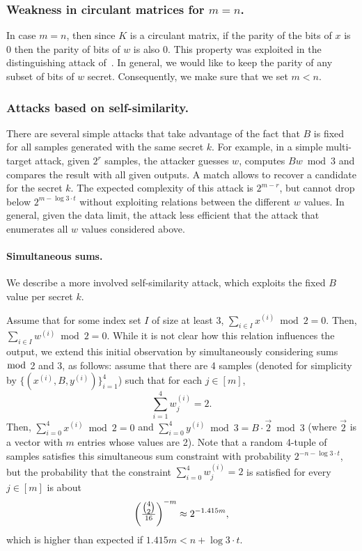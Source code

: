 \documentclass[orivec,envcountsect]{llncs}
\begin{document}
\subsubsection{Weakness in circulant matrices for $m=n$.}
In case $m =n$, then since $K$ is a circulant matrix, if the parity of the bits of $x$ is 0 then the parity of bits of $w$ is also 0.
This property was exploited in the distinguishing attack of~\cite{CheonCKK20}. In general, we would like to keep the parity of any subset of bits of $w$ secret. Consequently, we make sure that we set $m < n$.


\subsubsection{Attacks based on self-similarity.}

There are several simple attacks that take advantage of the fact that $B$ is fixed for all samples generated with the same secret $k$.
For example, in a simple multi-target attack, given $2^r$ samples, the attacker guesses $w$, computes $B w \bmod 3$ and compares the result
with all given outputs. A match allows to recover a candidate for the secret $k$.
The expected complexity of this attack is $2^{m-r}$, but cannot drop below $2^{m - \log 3 \cdot t}$ without exploiting relations between the different $w$ values. In general, given the data limit, the attack less efficient that the attack that enumerates all $w$ values considered above.

\paragraph{Simultaneous sums.}

We describe a more involved self-similarity attack, which exploits the fixed $B$ value per secret $k$.

Assume that for some index set $I$ of size at least 3, $\sum_{i \in I} x^{(i)} \bmod 2 = 0$. Then, $\sum_{i \in I} w^{(i)} \bmod 2 = 0$. While it is not clear how this relation influences the output,
we extend this initial observation by simultaneously considering sums $\bmod$ 2 and 3, as follows: 
assume that there are 4 samples (denoted for simplicity
by $ \{(x^{(i)},B,y^{(i)})\}_{i=1}^{4}$) such that for each $j \in [m]$, 
$$\sum_{i = 1}^{4} w^{(i)}_j = 2.$$
Then, $\sum_{i = 0}^{4} x^{(i)} \bmod 2 = 0$ and $\sum_{i = 0}^{4} y^{(i)} \bmod 3 = B \cdot \vec{2} \bmod 3$ (where $\vec{2}$ is a vector with $m$ entries whose values are 2).
Note that a random 4-tuple of samples satisfies this simultaneous sum constraint with probability
$2^{-n - \log 3 \cdot t}$, but the probability that the constraint $\sum_{i = 0}^{4} w^{(i)}_j = 2$ is satisfied for every $j \in [m]$ is about
$$\left( \tfrac{\tbinom{4}{2}}{16} \right) ^{-m} \approx 2^{- 1.415 m},$$
which is higher than expected if $1.415 m < n + \log 3 \cdot t $.
\end{document}
